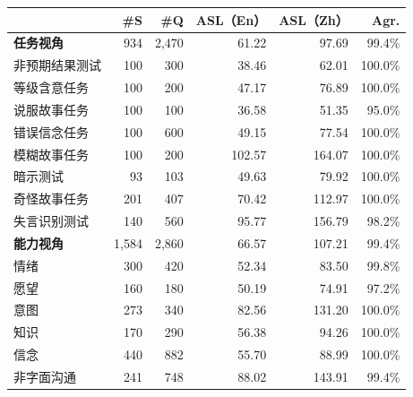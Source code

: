{\fontsize{8.5pt}{10.2pt}\selectfont
\setlength{\tabcolsep}{5pt}
\renewcommand{\arraystretch}{1.03}
\begin{tabularx}{0.99\linewidth}{@{}Xrrrrr@{}}
\toprule
 & \#S & \#Q & ASL（En） & ASL（Zh） & Agr. \\
\midrule
\textbf{任务视角} & 934 & 2,470 & 61.22 & 97.69 & 99.4\% \\
非预期结果测试 & 100 & 300 & 38.46 & 62.01 & 100.0\% \\
等级含意任务 & 100 & 200 & 47.17 & 76.89 & 100.0\% \\
说服故事任务 & 100 & 100 & 36.58 & 51.35 & 95.0\% \\
错误信念任务 & 100 & 600 & 49.15 & 77.54 & 100.0\% \\
模糊故事任务 & 100 & 200 & 102.57 & 164.07 & 100.0\% \\
暗示测试 & 93 & 103 & 49.63 & 79.92 & 100.0\% \\
奇怪故事任务 & 201 & 407 & 70.42 & 112.97 & 100.0\% \\
失言识别测试 & 140 & 560 & 95.77 & 156.79 & 98.2\% \\
\midrule
\textbf{能力视角} & 1,584 & 2,860 & 66.57 & 107.21 & 99.4\% \\
\midrule
情绪 & 300 & 420 & 52.34 & 83.50 & 99.8\% \\
愿望 & 160 & 180 & 50.19 & 74.91 & 97.2\% \\
意图 & 273 & 340 & 82.56 & 131.20 & 100.0\% \\
知识 & 170 & 290 & 56.38 & 94.26 & 100.0\% \\
信念 & 440 & 882 & 55.70 & 88.99 & 100.0\% \\
非字面沟通 & 241 & 748 & 88.02 & 143.91 & 99.4\% \\
\bottomrule
\end{tabularx}
}
\endgroup
